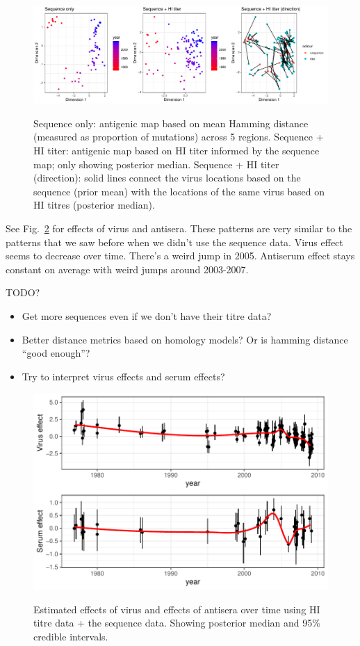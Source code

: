 \documentclass[12pt]{article}
\newcommand{\fref}[1]{Fig.~\ref{fig:#1}}
\begin{document}
\begin{figure}
\includegraphics[width=\textwidth]{../figure/h1n1_hamming_informed_map.pdf}
\label{fig:compare}
\caption{Sequence only: antigenic map based on mean Hamming distance (measured as proportion of mutations) across 5 regions. Sequence + HI titer: antigenic map based on HI titer informed by the sequence map; only showing posterior median. Sequence + HI titer (direction): solid lines connect the virus locations based on the sequence (prior mean) with the locations of the same virus based on HI titres (posterior median).}
\end{figure}

See \fref{eff} for effects of virus and antisera.
These patterns are very similar to the patterns that we saw before when we didn't use the sequence data.
Virus effect seems to decrease over time. There's a weird jump in 2005.
Antiserum effect stays constant on average with weird jumps around 2003-2007.

TODO?
\begin{itemize}
	\item Get more sequences even if we don't have their titre data?
	\item Better distance metrics based on homology models? Or is hamming distance ``good enough''?
	\item Try to interpret virus effects and serum effects?
\end{itemize}

\begin{figure}
\includegraphics[width=\textwidth]{../figure/h1n1_hamming_informed_effect.pdf}
\label{fig:eff}
\caption{Estimated effects of virus and effects of antisera over time using HI titre data + the sequence data. Showing posterior median and 95\% credible intervals.}
\end{figure}

\pagebreak


\end{document}
